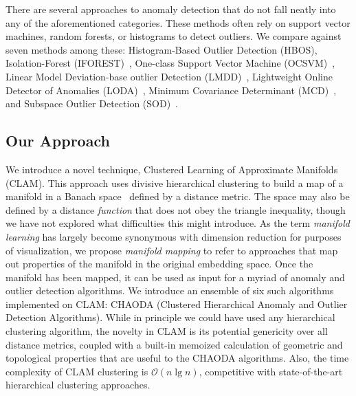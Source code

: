 There are several approaches to anomaly detection that do not fall neatly into any of the aforementioned categories.
These methods often rely on support vector machines, random forests, or histograms to detect outliers.
We compare against seven methods among these:
Histogram-Based Outlier Detection (HBOS)\cite{goldstein2012histogram},
Isolation-Forest (IFOREST)~\cite{tony2008iforest,tony2012iforest},
One-class Support Vector Machine (OCSVM)~\cite{sholkopf2001ocsvm},
Linear Model Deviation-base outlier Detection (LMDD)~\cite{arning1996linear},
Lightweight Online Detector of Anomalies (LODA)~\cite{pevny2016loda},
Minimum Covariance Determinant (MCD)~\cite{rousseeuw1999mcd,hardin2004mcd}, and
Subspace Outlier Detection (SOD)~\cite{kriegel2009sod}.


\subsection{Our Approach}
\label{subsec:introduction:chaoda}

We introduce a novel technique, Clustered Learning of Approximate Manifolds (CLAM).
This approach uses divisive hierarchical clustering to build a map of a manifold in a Banach space~\cite{banach1929fonctionnelles} defined by a distance metric.
The space may also be defined by a distance \textit{function} that does not obey the triangle inequality, though we have not explored what difficulties this might introduce.
As the term \emph{manifold learning} has largely become synonymous with dimension reduction for purposes of visualization, we propose \emph{manifold mapping} to refer to approaches that map out properties of the manifold in the original embedding space.
Once the manifold has been mapped, it can be used as input for a myriad of anomaly and outlier detection algorithms.
We introduce an ensemble of six such algorithms implemented on CLAM: CHAODA (Clustered Hierarchical Anomaly and Outlier Detection Algorithms).
While in principle we could have used any hierarchical clustering algorithm, the novelty in CLAM is its potential genericity over all distance metrics, coupled with a built-in memoized calculation of geometric and topological properties that are useful to the CHAODA algorithms.
Also, the time complexity of CLAM clustering is $\mathcal{O}(n \lg n)$, competitive with state-of-the-art hierarchical clustering approaches.

